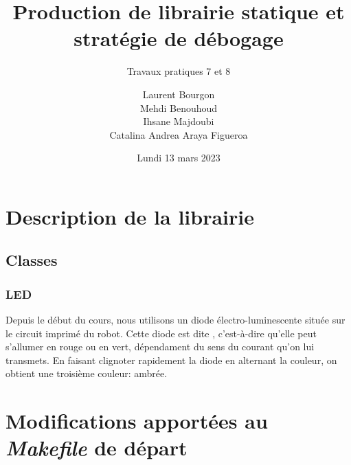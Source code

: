 \documentclass[12pt]{scrartcl}
\author{Laurent Bourgon \\Mehdi Benouhoud \\Ihsane Majdoubi \\Catalina Andrea Araya Figueroa}
\subtitle{Travaux pratiques 7 et 8}
\title{Production de librairie statique et stratégie de débogage}
\date{Lundi 13 mars 2023}
\begin{document}
\maketitle



\newpage

\section{Description de la librairie}

\subsection{Classes}
\subsubsection{LED}
Depuis le début du cours, nous utilisons un diode électro-luminescente située
sur le circuit imprimé du robot. Cette diode est dite  , c'est-à-dire
qu'elle peut s'allumer en rouge ou en vert, dépendament du sens du courant qu'on
lui transmets. En faisant clignoter rapidement la diode en alternant la couleur,
on obtient une troisième couleur: ambrée.
\newpage
\section{Modifications apportées au \textit{Makefile} de départ}
\end{document}
